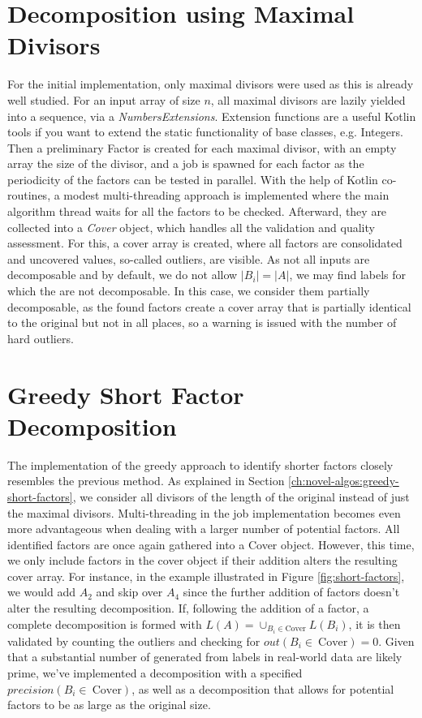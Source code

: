 \section{Decomposition using Maximal Divisors}
\label{ch:Implementation:max-divisor}
For the initial implementation, only maximal divisors were used as this is already well studied.
For an input array of size $n$, all maximal divisors are lazily yielded into a sequence, via a \textit{NumbersExtensions}.
Extension functions are a useful Kotlin tools if you want to extend the static functionality of base classes, e.g. Integers.
Then a preliminary Factor is created for each maximal divisor, with an empty array the size of the divisor, and a job is spawned for each factor as the periodicity of the factors can be tested in parallel.
With the help of Kotlin co-routines, a modest multi-threading approach is implemented where the main algorithm thread waits for all the factors to be checked. Afterward, they are collected into a \textit{Cover} object, which handles all the validation and quality assessment.
For this, a cover array is created, where all factors are consolidated and uncovered values, so-called outliers, are visible.
As not all inputs are decomposable and by default, we do not allow  $|B_i| = |A|$, we may find labels for which the \DFAs are not decomposable. In this case, we consider them partially decomposable, as the found factors create a cover array that is partially identical to the original but not in all places, so a warning is issued with the number of hard outliers.

\section{Greedy Short Factor Decomposition}
\label{ch:Implementation:greedy-short-factor}
The implementation of the greedy approach to identify shorter factors closely resembles the previous method.
As explained in Section \ref{ch:novel-algos:greedy-short-factors}, we consider all divisors of the length of the original \DFA instead of just the maximal divisors. Multi-threading in the job implementation becomes even more advantageous when dealing with a larger number of potential factors.
All identified factors are once again gathered into a Cover object.
However, this time, we only include factors in the cover object if their addition alters the resulting cover array.
For instance, in the example illustrated in Figure \ref{fig:short-factors}, we would add $A_2$ and skip over $A_4$ since the further addition of factors doesn't alter the resulting decomposition.
If, following the addition of a factor, a complete decomposition is formed with $L(A) = \cup_{B_i \in \text{Cover}} L(B_i)$, it is then validated by counting the outliers and checking for $out({B_i \in~\text{Cover}}) = 0$.
Given that a substantial number of \DFAs generated from labels in real-world data are likely prime, we've implemented a decomposition with a specified $precision({B_i \in~\text{Cover}})$, as well as a decomposition that allows for potential factors to be as large as the original \DFA size.


